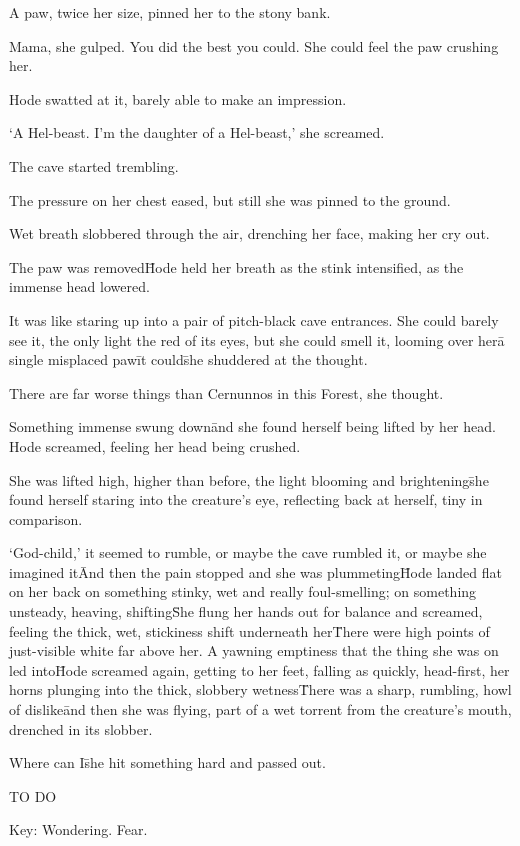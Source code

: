 A paw, twice her size, pinned her to the stony bank.

Mama, she gulped. You did the best you could. She could feel the paw crushing her.

Hode swatted at it, barely able to make an impression.

‘A Hel-beast. I’m the daughter of a Hel-beast,’ she screamed.

The cave started trembling.

The pressure on her chest eased, but still she was pinned to the ground.

Wet breath slobbered through the air, drenching her face, making her cry out.

The paw was removed\=Hode held her breath as the stink intensified, as the immense head lowered.

It was like staring up into a pair of pitch-black cave entrances. She could barely see it, the only 
light the red of its eyes, but she could smell it, looming over her\=a single misplaced paw\=it 
could\=she shuddered at the thought.

There are far worse things than Cernunnos in this Forest, she thought.

Something immense swung down\=and she found herself being lifted by her head. Hode screamed, feeling 
her head being crushed.

She was lifted high, higher than before, the light blooming and brightening\=she found herself staring 
into the creature’s eye, reflecting back at herself, tiny in comparison.

‘God-child,’ it seemed to rumble, or maybe the cave rumbled it, or maybe she imagined it\=

And then the pain stopped and she was plummeting\=Hode landed flat on her back on something stinky, wet 
and really foul-smelling; on something unsteady, heaving, shifting\=

She flung her hands out for balance and screamed, feeling the thick, wet, stickiness shift underneath 
her\=

There were high points of just-visible white far above her. A yawning emptiness that the thing she was 
on led into\=

Hode screamed again, getting to her feet, falling as quickly, head-first, her horns plunging into the 
thick, slobbery wetness\=

There was a sharp, rumbling, howl of dislike\=and then she was flying, part of a wet torrent from the 
creature’s mouth, drenched in its slobber.

Where can I\=she hit something hard and passed out.

TO DO

Key: Wondering. Fear.
